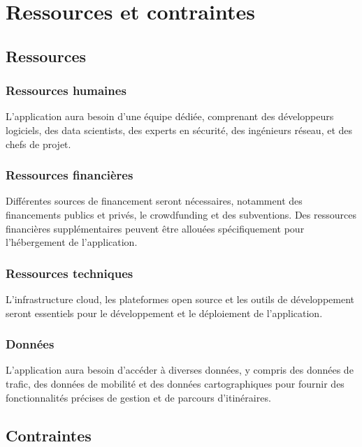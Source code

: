 \section{Ressources et contraintes}

\subsection{Ressources}

\subsubsection*{Ressources humaines}
L'application aura besoin d'une équipe dédiée, comprenant des développeurs logiciels, des data scientists, des experts en sécurité, des ingénieurs réseau, et des chefs de projet.

\subsubsection*{Ressources financières}
Différentes sources de financement seront nécessaires, notamment des financements publics et privés, le crowdfunding et des subventions. Des ressources financières supplémentaires peuvent être allouées spécifiquement pour l'hébergement de l'application.

\subsubsection*{Ressources techniques}
L'infrastructure cloud, les plateformes open source et les outils de développement seront essentiels pour le développement et le déploiement de l'application.

\subsubsection*{Données}
L'application aura besoin d'accéder à diverses données, y compris des données de trafic, des données de mobilité et des données cartographiques pour fournir des fonctionnalités précises de gestion et de parcours d'itinéraires.

\subsection{Contraintes}

